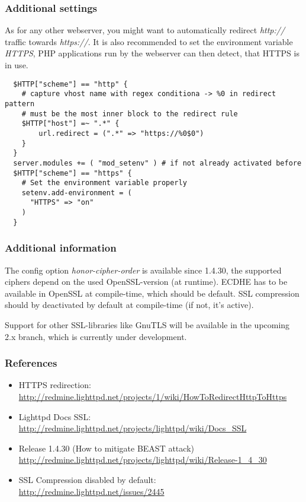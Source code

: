 \subsubsection{Additional settings}
As for any other webserver, you might want to automatically redirect \emph{http://}
traffic towards \emph{https://}. It is also recommended to set the environment
variable \emph{HTTPS}, PHP applications run by the webserver can then detect,
that HTTPS is in use.

\begin{lstlisting}
  $HTTP["scheme"] == "http" {
    # capture vhost name with regex conditiona -> %0 in redirect pattern
    # must be the most inner block to the redirect rule
    $HTTP["host"] =~ ".*" {
        url.redirect = (".*" => "https://%0$0")
    }
  }
  server.modules += ( "mod_setenv" ) # if not already activated before
  $HTTP["scheme"] == "https" {
    # Set the environment variable properly
    setenv.add-environment = (
      "HTTPS" => "on"
    )
  }
\end{lstlisting}

\subsubsection{Additional information} 
The config option \emph{honor-cipher-order} is available since 1.4.30, the
supported ciphers depend on the used OpenSSL-version (at runtime). ECDHE has to
be available in OpenSSL at compile-time, which should be default. SSL
compression should by deactivated by default at compile-time (if not, it's
active).

Support for other SSL-libraries like GnuTLS will be available in the upcoming
2.x branch, which is currently under development.

\subsubsection{References} 
\begin{itemize}
  \item HTTPS redirection: \url{http://redmine.lighttpd.net/projects/1/wiki/HowToRedirectHttpToHttps}
  \item Lighttpd Docs SSL: \url{http://redmine.lighttpd.net/projects/lighttpd/wiki/Docs\_SSL}
  \item Release 1.4.30 (How to mitigate BEAST attack) \url{http://redmine.lighttpd.net/projects/lighttpd/wiki/Release-1\_4\_30}
  \item SSL Compression disabled by default: \url{http://redmine.lighttpd.net/issues/2445}
\end{itemize}

